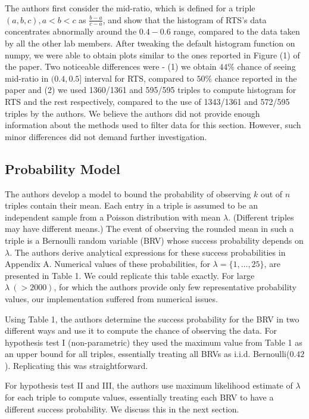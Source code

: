 \documentclass{article}
\begin{document}
The authors first consider the mid-ratio, which is defined for a triple \((a, b, c), a<b<c\) as
\(\frac{b-a}{c-a}\), and show that the histogram of RTS's data concentrates
abnormally around the \(0.4-0.6\) range, compared to the data taken by all the other lab members.
After tweaking the default histogram function on numpy, we were able to obtain plots similar to the ones reported in Figure (1) of the paper. Two noticeable differences were - (1) we obtain $44\%$ chance of seeing mid-ratio in $(0.4, 0.5]$ interval for RTS, compared to $50\%$ chance reported in the paper and (2) we used 1360/1361 and 595/595 triples to compute histogram for RTS and the rest respectively, compared to the use of 1343/1361 and 572/595 triples by the authors.
We believe the authors did not provide enough information about the methods used to filter data for this section. However, such minor differences did not demand further investigation.

    \subsection{Probability Model}\label{probability-model}

The authors develop a model to bound the probability of observing $k$ out of $n$ triples contain their mean.
Each entry in a triple is assumed to be an independent sample from a Poisson distribution with mean $\lambda$. (Different triples may have different means.)
The event of observing the rounded mean in such a triple is a Bernoulli random variable (BRV) whose success probability depends on $\lambda$.
The authors derive analytical expressions for these success probabilities in Appendix A.
Numerical values of these probabilities, for $\lambda=\{1, \ldots, 25\}$, are presented in Table 1.
We could replicate this table exactly.
For large $\lambda\ (>2000)$, for which the authors provide only few representative probability values, our implementation suffered from numerical issues.

Using Table 1, the authors determine the success probability for the BRV in two different ways and use it to compute the chance of observing the data.  For hypothesis test I (non-parametric) they used the maximum value from Table 1 as an upper bound for all triples, essentially treating all BRVs as i.i.d. Bernoulli($0.42$). Replicating this was straightforward.

For hypothesis test II and III, the authors use maximum likelihood estimate of $\lambda$ for each triple to compute values, essentially treating each BRV to have a different success probability. We discuss this in the next section.
\end{document}
